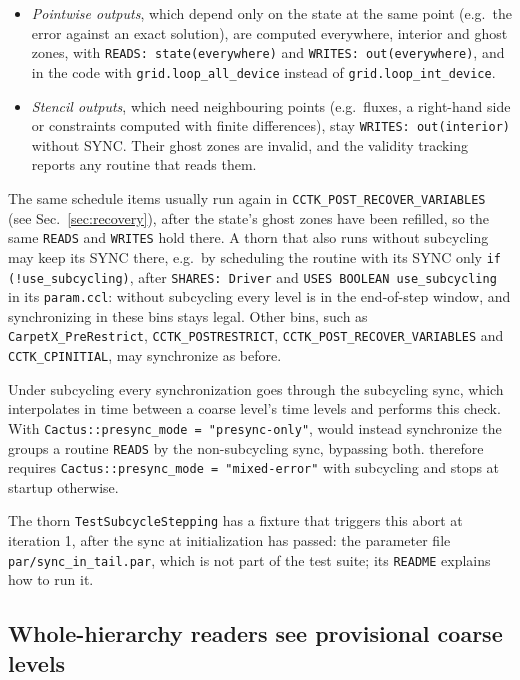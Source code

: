 %
\begin{itemize}
\item \emph{Pointwise outputs}, which depend only on the state at the same point (e.g.\ the error against an exact solution), are computed everywhere, interior and ghost zones, with \texttt{READS: state(everywhere)} and \texttt{WRITES: out(everywhere)}, and in the code with \texttt{grid.loop\_all\_device} instead of \texttt{grid.loop\_int\_device}.
\item \emph{Stencil outputs}, which need neighbouring points (e.g.\ fluxes, a right-hand side or constraints computed with finite differences), stay \texttt{WRITES: out(interior)} without SYNC. Their ghost zones are invalid, and the validity tracking reports any routine that reads them.
\end{itemize}
%
The same schedule items usually run again in \texttt{CCTK\_POST\_RECOVER\_VARIABLES} (see Sec.~\ref{sec:recovery}), after the state's ghost zones have been refilled, so the same \texttt{READS} and \texttt{WRITES} hold there. A thorn that also runs without subcycling may keep its SYNC there, e.g.\ by scheduling the routine with its SYNC only \texttt{if (!use\_subcycling)}, after \texttt{SHARES: Driver} and \texttt{USES BOOLEAN use\_subcycling} in its \texttt{param.ccl}: without subcycling every level is in the end-of-step window, and synchronizing in these bins stays legal. Other bins, such as \texttt{CarpetX\_PreRestrict}, \texttt{CCTK\_POSTRESTRICT}, \texttt{CCTK\_POST\_RECOVER\_VARIABLES} and \texttt{CCTK\_CPINITIAL}, may synchronize as before.

Under subcycling every synchronization goes through the subcycling sync, which interpolates in time between a coarse level's time levels and performs this check. With \texttt{Cactus::presync\_mode = "presync-only"}, \CarpetX\space would instead synchronize the groups a routine \texttt{READS} by the non-subcycling sync, bypassing both. \CarpetX\space therefore requires \texttt{Cactus::presync\_mode = "mixed-error"} with subcycling and stops at startup otherwise.

The thorn \texttt{TestSubcycleStepping} has a fixture that triggers this abort at iteration 1, after the sync at initialization has passed: the parameter file \texttt{par/sync\_in\_tail.par}, which is not part of the test suite; its \texttt{README} explains how to run it.

\subsection{Whole-hierarchy readers see provisional coarse levels}

